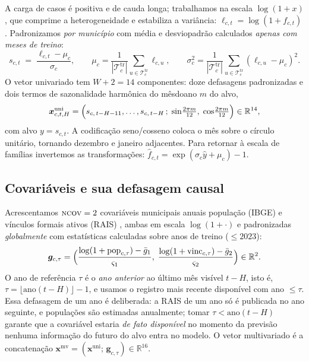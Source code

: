 \documentclass[12pt,a4paper,oneside]{article}
\begin{document}
A carga de casos é positiva e de cauda longa; trabalhamos na escala
$\log(1+x)$, que comprime a heterogeneidade e estabiliza a variância:
$\ell_{c,t}=\log(1+f_{c,t})$. Padronizamos \emph{por município} com média e
desvio\-padrão calculados \emph{apenas com meses de treino}:
\begin{equation}
s_{c,t} \;=\; \frac{\ell_{c,t}-\mu_c}{\sigma_c},
\qquad
\mu_c=\frac{1}{|\mathcal{T}_c^{\text{tr}}|}\!\!\sum_{u\in\mathcal{T}_c^{\text{tr}}}\!\!\ell_{c,u},
\qquad
\sigma_c^2=\frac{1}{|\mathcal{T}_c^{\text{tr}}|}\!\!\sum_{u\in\mathcal{T}_c^{\text{tr}}}\!\!(\ell_{c,u}-\mu_c)^2 .
\label{eq:padroniza}
\end{equation}
O vetor univariado tem $W+2=14$ componentes: doze defasagens padronizadas
e dois termos de sazonalidade harmônica do mês\-do\-ano $m$ do alvo,
\begin{equation}
\bm{x}^{\text{uni}}_{c,t,H}
=\Bigl(s_{c,\,t-H-11},\dots,s_{c,\,t-H}\,;\;
\sin\!\tfrac{2\pi m}{12},\;\cos\!\tfrac{2\pi m}{12}\Bigr)\in\mathbb{R}^{14},
\label{eq:atributos}
\end{equation}
com alvo $y=s_{c,t}$. A codificação seno/cosseno coloca o mês sobre o
círculo unitário, tornando dezembro e janeiro adjacentes. Para retornar à
escala de famílias invertemos as transformações:
$\widehat{f}_{c,t}=\exp(\sigma_c\widehat{y}+\mu_c)-1$.

\subsection{Covariáveis e sua defasagem causal}

Acrescentamos $\textsc{ncov}=2$ covariáveis municipais anuais
\textemdash{} população (IBGE) e vínculos formais ativos (RAIS)
\textemdash{}, ambas em escala $\log(1+\cdot)$ e padronizadas
\emph{globalmente} com estatísticas calculadas sobre anos de treino
(${}\le 2023$):
\begin{equation}
\bm{g}_{c,\tau}
=\Bigl(\frac{\log(1+\text{pop}_{c,\tau})-\bar{g}_1}{\varsigma_1},\;
       \frac{\log(1+\text{vinc}_{c,\tau})-\bar{g}_2}{\varsigma_2}\Bigr)\in\mathbb{R}^{2}.
\label{eq:cov}
\end{equation}
O ano de referência $\tau$ é o \emph{ano anterior} ao último mês visível
$t-H$, isto é, $\tau=\lfloor\text{ano}(t-H)\rfloor-1$, e usamos o registro
mais recente disponível com ano ${}\le\tau$. Essa defasagem de um ano é
deliberada: a RAIS de um ano só é publicada no ano seguinte, e populações
são estimadas anualmente; tomar $\tau<\text{ano}(t-H)$ garante que a
covariável estaria \emph{de fato disponível} no momento da previsão
\textemdash{} nenhuma informação do futuro do alvo entra no modelo. O
vetor multivariado é a concatenação
$\bm{x}^{\text{mv}}=(\bm{x}^{\text{uni}};\,\bm{g}_{c,\tau})\in\mathbb{R}^{16}$.
\end{document}
